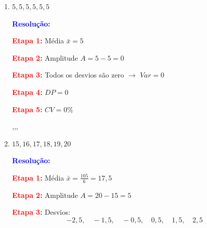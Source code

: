 \documentclass[11pt]{article}
\newcommand{\respostaNum}[1]{\textcolor{blue}{\boxed{#1}}}
\newcommand{\resolucao}{\textbf{\textcolor{blue}{Resolução:}}}
\begin{document}
\begin{multicols}{2}
\begin{enumerate}[leftmargin=*]
\begin{enumerate}[label=\alph*)]
\resolucao

\textbf{\textcolor{red}{Etapa 1:}} Calcular a média
\[
\bar{x} = \frac{10 + 20 + 30 + 40 + 50}{5} = \frac{150}{5} = 30
\]

\textbf{\textcolor{red}{Etapa 2:}} Calcular amplitude
\[
A = 50 - 10 = 40
\]

\textbf{\textcolor{red}{Etapa 3:}} Calcular desvios
\[
10-30 = -20,\quad 20-30 = -10,\quad 30-30 = 0,\quad 40-30 = 10,\quad 50-30 = 20
\]

\textbf{\textcolor{red}{Etapa 4:}} Quadrados dos desvios
\[
400,\quad 100,\quad 0,\quad 100,\quad 400
\]

\textbf{\textcolor{red}{Etapa 5:}} Somar os quadrados
\[
400 + 100 + 0 + 100 + 400 = 1000
\]

\textbf{\textcolor{red}{Etapa 6:}} Calcular variância
\[
Var = \frac{1000}{5} = 200
\]

\textbf{\textcolor{red}{Etapa 7:}} Calcular desvio padrão
\[
DP = \sqrt{200} = 10\sqrt{2} \approx 14,14
\]

\textbf{\textcolor{red}{Etapa 8:}} Calcular coeficiente de variação
\[
CV = \frac{14,14}{30} \times 100\% \approx 47,1\%
\]

\respostaNum{40},\quad \respostaNum{200},\quad \respostaNum{14,14},\quad \respostaNum{47,1\%}

\item $5, 5, 5, 5, 5, 5$

\resolucao

\textbf{\textcolor{red}{Etapa 1:}} Média $\bar{x} = 5$

\textbf{\textcolor{red}{Etapa 2:}} Amplitude $A = 5 - 5 = 0$

\textbf{\textcolor{red}{Etapa 3:}} Todos os desvios são zero $\rightarrow$ $Var = 0$

\textbf{\textcolor{red}{Etapa 4:}} $DP = 0$

\textbf{\textcolor{red}{Etapa 5:}} $CV = 0\%$

\respostaNum{0},\quad \respostaNum{0},\quad \respostaNum{0},\quad \respostaNum{0\%}

\item $15, 16, 17, 18, 19, 20$

\resolucao

\textbf{\textcolor{red}{Etapa 1:}} Média $\bar{x} = \frac{105}{6} = 17,5$

\textbf{\textcolor{red}{Etapa 2:}} Amplitude $A = 20 - 15 = 5$

\textbf{\textcolor{red}{Etapa 3:}} Desvios:
\[
-2,5,\quad -1,5,\quad -0,5,\quad 0,5,\quad 1,5,\quad 2,5
\]


\end{enumerate}
\end{enumerate}
\end{multicols}
\end{document}

